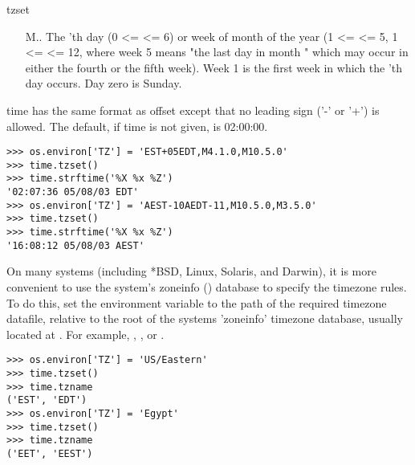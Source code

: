 \begin{funcdesc}{tzset}{}
\begin{itemize}
\begin{itemize}
      \item[M\var{m}.\var{n}.\var{d}]
        The 'th day (0 <=  <= 6) or week  
        of month  of the year (1 <=  <= 5, 
        1 <=  <= 12, where week 5 means "the last  day
        in month " which may occur in either the fourth or 
        the fifth week). Week 1 is the first week in which the 
        'th day occurs. Day zero is Sunday.
    \end{itemize}

    time has the same format as offset except that no leading sign ('-' or
    '+') is allowed. The default, if time is not given, is 02:00:00.
\end{itemize}


\begin{verbatim}
>>> os.environ['TZ'] = 'EST+05EDT,M4.1.0,M10.5.0'
>>> time.tzset()
>>> time.strftime('%X %x %Z')
'02:07:36 05/08/03 EDT'
>>> os.environ['TZ'] = 'AEST-10AEDT-11,M10.5.0,M3.5.0'
>>> time.tzset()
>>> time.strftime('%X %x %Z')
'16:08:12 05/08/03 AEST'
\end{verbatim}

On many \UNIX{} systems (including *BSD, Linux, Solaris, and Darwin), it
is more convenient to use the system's zoneinfo () 
database to specify the timezone rules. To do this, set the 
 environment variable to the path of the required timezone 
datafile, relative to the root of the systems 'zoneinfo' timezone database,
usually located at . For example, 
, ,  or 
.

\begin{verbatim}
>>> os.environ['TZ'] = 'US/Eastern'
>>> time.tzset()
>>> time.tzname
('EST', 'EDT')
>>> os.environ['TZ'] = 'Egypt'
>>> time.tzset()
>>> time.tzname
('EET', 'EEST')
\end{verbatim}

\end{funcdesc}


\begin{seealso}
\end{seealso}
